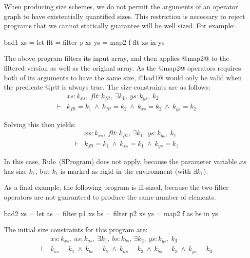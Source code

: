 When producing size schemes, we do not permit the arguments of an operator graph to have existentially quantified sizes. This restriction is necessary to reject programs that we cannot statically guarantee will be well sized. For example:
\begin{code}
    bad1 xs  = let flt   = filter p xs
                   ys    = map2   f flt xs
               in  ys
\end{code}

The above program filters its input array, and then applies @map2@ to the filtered version as well as the original array. As the @map2@ operators requires both of its arguments to have the same size, @bad1@ would only be valid when the predicate @p@ is always true. The size constraints are as follows:
$$
\begin{array}{ll}
       & xs : k_{xs},~ flt : k_{flt},~ \exists k_1,~ ys : k_{ys},~ k_2
\\
\vdash &          k_{flt}  = k_1
        ~\wedge~  k_{flt}  = k_2
        ~\wedge~  k_{xs}   = k_2
        ~\wedge~  k_{ys}   = k_2
\end{array}
$$

\noindent
Solving this then yields:
$$
\begin{array}{ll}
       & xs : k_{xs},~ flt : k_{flt},~ \exists k_1,~ ys : k_{ys},~ k_1
\\
\vdash &          k_{flt}  = k_1
        ~\wedge~  k_{xs}   = k_1
        ~\wedge~  k_{ys}   = k_1
\end{array}
$$

In this case, Rule~(SProgram) does not apply, because the parameter variable $xs$ has size $k_1$, but $k_1$ is marked as rigid in the environment (with $\exists k_1$). 

As a final example, the following program is ill-sized, because the two filter operators are not guaranteed to produce the same number of elements.
\begin{code}
     bad2 xs = let as  = filter p1 xs
                   bs  = filter p2 xs
                   ys  = map2   f  as bs
               in  ys
\end{code}

The initial size constraints for this program are:
$$
\begin{array}{ll}
       & xs : k_{xs},~ as : k_{as},~ \exists k_1,~ bs : k_{bs},~ \exists k_2,~ ys : k_{ys},~ k_3
\\
\vdash &          k_{as}   = k_1
        ~\wedge~  k_{bs}   = k_2
        ~\wedge~  k_{as}   = k_3
        ~\wedge~  k_{bs}   = k_3
        ~\wedge~  k_{ys}   = k_3
\end{array}
$$

